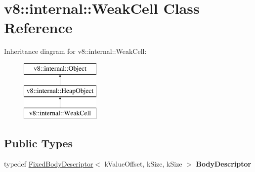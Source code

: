 \hypertarget{classv8_1_1internal_1_1_weak_cell}{}\section{v8\+:\+:internal\+:\+:Weak\+Cell Class Reference}
\label{classv8_1_1internal_1_1_weak_cell}
Inheritance diagram for v8\+:\+:internal\+:\+:Weak\+Cell\+:\begin{figure}[H]
\begin{center}
\leavevmode
\includegraphics[height=3.000000cm]{classv8_1_1internal_1_1_weak_cell}
\end{center}
\end{figure}
\subsection*{Public Types}
\begin{DoxyCompactItemize}
\item 
typedef \hyperlink{classv8_1_1internal_1_1_fixed_body_descriptor}{Fixed\+Body\+Descriptor}$<$ k\+Value\+Offset, k\+Size, k\+Size $>$ {\bfseries Body\+Descriptor}\hypertarget{classv8_1_1internal_1_1_weak_cell_aabd7bdb72899369fdb5aa2317f2d2419}{}\label{classv8_1_1internal_1_1_weak_cell_aabd7bdb72899369fdb5aa2317f2d2419}

\end{DoxyCompactItemize}
